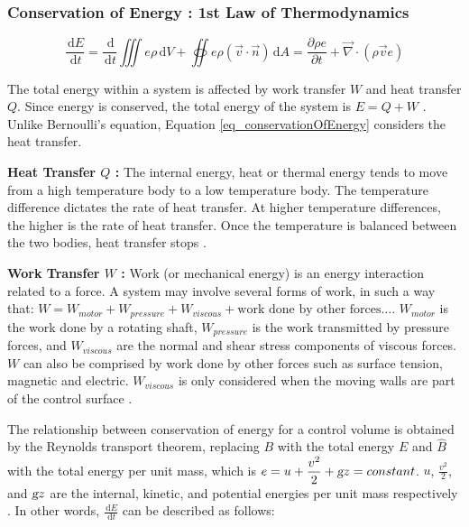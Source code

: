 \documentclass{article}
\newcommand{\ud}{\,\mathrm{d}}
\begin{document}
\subsubsection*{Conservation of Energy : 1st Law of Thermodynamics}

\begin{equation}
\frac{\ud E}{\ud t} = \frac{\ud}{\ud t} \iiint e \rho \ud V + \oiint e \rho (\vec{v} \cdot \vec{n}) \ud A = \frac{\partial \rho e}{ \partial t} + \vec{\nabla} \cdot (\rho \vec{v} e)
\label{eq_conservationOfEnergy}
\end{equation}

The total energy within a system is affected by work transfer $W$ and heat transfer $Q$. Since energy is conserved, the total energy of the system is $\displaystyle E = Q + W$ \cite{Moukalled2016, White2011}. Unlike Bernoulli's equation, Equation \ref{eq_conservationOfEnergy} considers the heat transfer.

\textbf{Heat Transfer $Q$ :} The internal energy, heat or thermal energy tends to move from a high temperature body to a low temperature body. The temperature difference dictates the rate of heat transfer. At higher temperature differences, the higher is the rate of heat transfer. Once the temperature is balanced between the two bodies, heat transfer stops \cite{White2011}.

\textbf{Work Transfer $W$ :} Work (or mechanical energy) is an energy interaction related to a force. A system may involve several forms of work, in such a way that: $\displaystyle W = W_{motor} + W_{pressure} + W_{viscous} + \textrm{work done by other forces} \dots$. $W_{motor}$ is the work done by a rotating shaft,  $W_{pressure}$ is the work transmitted by pressure forces, and $W_{viscous}$ are the normal and shear stress components of viscous forces. $W$ can also be comprised by work done by other forces such as surface tension, magnetic and electric. $W_{viscous}$ is only considered when the moving walls are part of the control surface \cite{White2011}.

The relationship between conservation of energy for a control volume is obtained by the Reynolds transport theorem, replacing $B$ with the total energy $E$ and $\hat{B}$ with the total energy per unit mass, which is $e = \displaystyle u + \frac{v^2}{2} + \textsl{g} z = constant$. $u$, $\displaystyle \frac{v^2}{2}$, and $\textsl{g} z$ are the internal, kinetic, and potential energies per unit mass respectively \cite{Moukalled2016, White2011}. In other words, $\displaystyle \frac{\ud E}{\ud t}$ can be described as follows:
\end{document}
